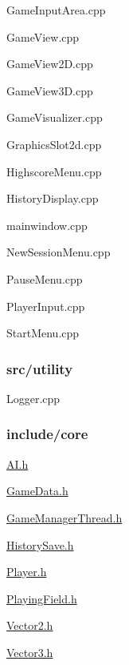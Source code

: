 \begin{DoxyItemize}
\item Game\-Input\-Area.\-cpp
\item Game\-View.\-cpp
\item Game\-View2\-D.\-cpp
\item Game\-View3\-D.\-cpp
\item Game\-Visualizer.\-cpp
\item Graphics\-Slot2d.\-cpp
\item Highscore\-Menu.\-cpp
\item History\-Display.\-cpp
\item mainwindow.\-cpp
\item New\-Session\-Menu.\-cpp
\item Pause\-Menu.\-cpp
\item Player\-Input.\-cpp
\item Start\-Menu.\-cpp
\end{DoxyItemize}

\subsubsection*{src/utility}


\begin{DoxyItemize}
\item Logger.\-cpp
\end{DoxyItemize}

\subsubsection*{include/core}


\begin{DoxyItemize}
\item \hyperlink{AI_8h_source}{A\-I.\-h}
\item \hyperlink{GameData_8h_source}{Game\-Data.\-h}
\item \hyperlink{GameManagerThread_8h_source}{Game\-Manager\-Thread.\-h}
\item \hyperlink{HistorySave_8h_source}{History\-Save.\-h}
\item \hyperlink{Player_8h_source}{Player.\-h}
\item \hyperlink{PlayingField_8h_source}{Playing\-Field.\-h}
\item \hyperlink{Vector2_8h_source}{Vector2.\-h}
\item \hyperlink{Vector3_8h_source}{Vector3.\-h}
\end{DoxyItemize}

